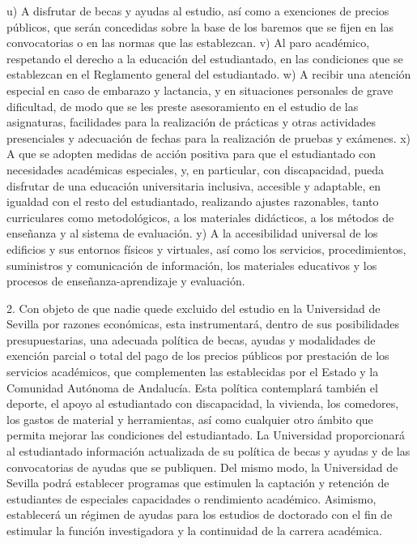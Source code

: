 \documentclass{article}
\begin{document}
\begin{itemize}
\begin{itemize}
\begin{scriptsize}
                  u) A disfrutar de becas y ayudas al estudio, así como a exenciones de precios públicos, que serán concedidas sobre la base de los baremos que se fijen en las convocatorias o en las normas que las establezcan.
                  v) Al paro académico, respetando el derecho a la educación del estudiantado, en las condiciones que se establezcan en el Reglamento general del estudiantado.
                  w) A recibir una atención especial en caso de embarazo y lactancia, y en situaciones personales de grave dificultad, de modo que se les preste asesoramiento en el estudio de las asignaturas, facilidades para la realización de prácticas y otras actividades presenciales y adecuación de fechas para la realización de pruebas y exámenes.
                  x) A que se adopten medidas de acción positiva para que el estudiantado con necesidades académicas especiales, y, en particular, con discapacidad, pueda disfrutar de una educación universitaria inclusiva, accesible y adaptable, en igualdad con el resto del estudiantado, realizando ajustes razonables, tanto curriculares como metodológicos, a los materiales didácticos, a los métodos de enseñanza y al sistema de evaluación.
                  y) A la accesibilidad universal de los edificios y sus entornos físicos y virtuales, así como los servicios, procedimientos, suministros y comunicación de información, los materiales educativos y los procesos de enseñanza-aprendizaje y evaluación.

                  2. Con objeto de que nadie quede excluido del estudio en la Universidad de Sevilla por razones económicas, esta instrumentará, dentro de sus posibilidades presupuestarias, una adecuada política de becas, ayudas y modalidades de exención parcial o total del pago de los precios públicos por prestación de los servicios académicos, que complementen las establecidas por el Estado y la Comunidad Autónoma de Andalucía. Esta política contemplará también el deporte, el apoyo al estudiantado con discapacidad, la vivienda, los comedores, los gastos de material y herramientas, así como cualquier otro ámbito que permita mejorar las condiciones del estudiantado.
                  La Universidad proporcionará al estudiantado información actualizada de su política de becas y ayudas y de las convocatorias de ayudas que se publiquen.
                  Del mismo modo, la Universidad de Sevilla podrá establecer programas que estimulen la captación y retención de estudiantes de especiales capacidades o rendimiento académico. Asimismo, establecerá un régimen de ayudas para los estudios de doctorado con el fin de estimular la función investigadora y la continuidad de la carrera académica.


\end{scriptsize}
\end{itemize}
\end{itemize}
\end{document}
